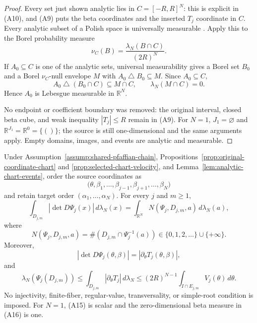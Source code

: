 \begin{proof}
Every set just shown analytic lies in $C=[-R,R]^N$: this is explicit in
\textup{(A10)}, and \textup{(A9)} puts the beta coordinates and the
inserted $T_j$ coordinate in $C$.  Every analytic subset of a Polish space
is universally measurable
\citep[Section~21, Theorem~21.10, p.~155]{Kechris1995}.  Apply this to the
Borel probability measure
\[
\nu_C(B)=\frac{\lambda_N(B\cap C)}{(2R)^N}.
\]
If $A_0\subseteq C$ is one of the analytic sets, universal measurability
gives a Borel set $B_0$ and a Borel $\nu_C$-null envelope $M$ with
$A_0\mathbin\triangle B_0\subseteq M$.  Since $A_0\subseteq C$,
\[
A_0\mathbin\triangle(B_0\cap C)\subseteq M\cap C,
\qquad \lambda_N(M\cap C)=0.
\]
Hence $A_0$ is Lebesgue measurable in $\mathbb R^N$.

No endpoint or coefficient boundary was removed: the original interval,
closed beta cube, and weak inequality $|T_j|\leq R$ remain in
\textup{(A9)}.  For $N=1$, $J_1=\varnothing$ and
$\mathbb R^{J_1}=\mathbb R^0=\{()\}$; the source is still
one-dimensional and the same arguments apply.  Empty domains, images, and
events are analytic and measurable.
\end{proof}

\begin{proposition}
\label{prop:localized-area-sweep}
Under Assumption~\ref{assump:shared-pfaffian-chain},
Propositions~\ref{prop:original-coordinate-chart} and
\ref{prop:selected-chart-velocity}, and
Lemma~\ref{lem:analytic-chart-events}, order the source coordinates as
\[
\bigl(\theta,\beta_1,\ldots,\beta_{j-1},
\beta_{j+1},\ldots,\beta_N\bigr)
\]
and retain target order $(\alpha_1,\ldots,\alpha_N)$.  For every $j$ and
$m\geq1$,
\[
\int_{D_{j,m}}|\det D\Psi_j(x)|\,d\lambda_N(x)
=\int_{\mathbb R^N}N(\Psi_j,D_{j,m},a)\,d\lambda_N(a),
\tag{A14}
\]
where
\[
N(\Psi_j,D_{j,m},a)
=\#(D_{j,m}\cap\Psi_j^{-1}(a))
\in\{0,1,2,\ldots\}\cup\{+\infty\}.
\]
Moreover,
\[
|\det D\Psi_j(\theta,\beta)|
=|\partial_\theta T_j(\theta,\beta)|,
\tag{A15}
\]
and
\[
\lambda_N(\Psi_j(D_{j,m}))
\leq\int_{D_{j,m}}|\partial_\theta T_j|\,d\lambda_N
\leq(2R)^{N-1}\int_{I\cap E_{j,m}}V_j(\theta)\,d\theta.
\tag{A16}
\]
No injectivity, finite-fiber, regular-value, transversality, or simple-root
condition is imposed.  For $N=1$, \textup{(A15)} is scalar and the
zero-dimensional beta measure in \textup{(A16)} is one.
\end{proposition}

